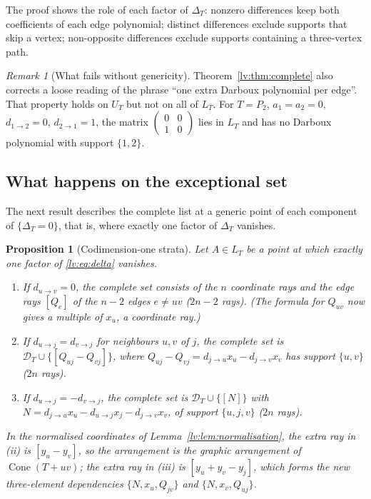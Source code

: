 \documentclass[11pt,a4paper]{article}
\newtheorem{proposition}[theorem]{Proposition}
\theoremstyle{definition}
\theoremstyle{remark}
\newtheorem{remark}[theorem]{Remark}
\newcommand{\Cone}{\operatorname{Cone}}
\begin{document}
The proof shows the role of each factor of $\Delta_T$: nonzero differences keep both coefficients of each edge polynomial; distinct differences exclude supports that skip a vertex; non-opposite differences exclude supports containing a three-vertex path.

\begin{remark}[What fails without genericity]
\label{lv:rem:raw-family}
Theorem~\ref{lv:thm:complete} also corrects a loose reading of the phrase ``one extra Darboux polynomial per edge''. That property holds on $U_T$ but not on all of $L_T$. For $T=P_2$, $a_1=a_2=0$, $d_{1\to2}=0$, $d_{2\to1}=1$, the matrix $\begin{pmatrix}0&0\\1&0\end{pmatrix}$ lies in $L_T$ and has no Darboux polynomial with support $\{1,2\}$.
\end{remark}

\subsection{What happens on the exceptional set}

The next result describes the complete list at a generic point of each component of $\{\Delta_T=0\}$, that is, where exactly one factor of $\Delta_T$ vanishes.

\begin{proposition}[Codimension-one strata]
\label{lv:prop:strata}
Let $A\in L_T$ be a point at which exactly one factor of \eqref{lv:eq:delta} vanishes.
\begin{enumerate}
\item If $d_{u\to v}=0$, the complete set consists of the $n$ coordinate rays and the edge rays $[Q_{e}]$ of the $n-2$ edges $e\neq uv$ ($2n-2$ rays). (The formula for $Q_{uv}$ now gives a multiple of $x_u$, a coordinate ray.)
\item If $d_{u\to j}=d_{v\to j}$ for neighbours $u,v$ of $j$, the complete set is $\mathcal D_T\cup\{[Q_{uj}-Q_{vj}]\}$, where $Q_{uj}-Q_{vj}=d_{j\to u}x_u-d_{j\to v}x_v$ has support $\{u,v\}$ ($2n$ rays).
\item If $d_{u\to j}=-d_{v\to j}$, the complete set is $\mathcal D_T\cup\{[N]\}$ with $N=d_{j\to u}x_u-d_{u\to j}x_j-d_{j\to v}x_v$, of support $\{u,j,v\}$ ($2n$ rays).
\end{enumerate}
In the normalised coordinates of Lemma~\ref{lv:lem:normalisation}, the extra ray in (ii) is $[y_u-y_v]$, so the arrangement is the graphic arrangement of $\Cone(T+uv)$; the extra ray in (iii) is $[y_u+y_v-y_j]$, which forms the new three-element dependencies $\{N,x_u,Q_{jv}\}$ and $\{N,x_v,Q_{uj}\}$.
\end{proposition}
\end{document}
